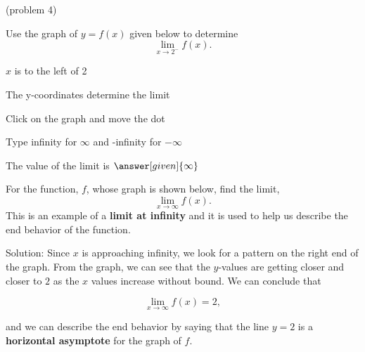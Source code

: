 \documentclass{ximera}
\begin{document}
\begin{problem}(problem 4)

  Use the graph of $y = f(x)$ given below to determine
  \[
  \lim_{x\to 2^-} f(x).
  \]
  
    \begin{hint}
      $x$ is to the left of 2
    \end{hint}
    \begin{hint}
      The y-coordinates determine the limit
    \end{hint}
		\begin{hint}
		  Click on the graph and move the dot
		\end{hint}
		\begin{hint}
		 Type infinity for $\infty$ and -infinity for $-\infty$
		\end{hint}
		The value of the limit is
		 $\answer[given]{\infty}$


	
\end{problem}

\begin{example}[example 5]
For the function, $f$, whose graph is shown below, find the limit,
\[
\lim_{x \to \infty}f(x).
\] 
This is an example of a \textbf{limit at infinity} and it is used to help 
us describe the end behavior of the function.




\vspace{.25in}
Solution:  Since $x$ is approaching infinity, we look for a pattern on the right end of the graph.  
From the graph, we can see that the $y$-values are getting closer and closer to $2$ as the $x$ values 
increase without bound. We can conclude that 

\[
\lim_{x \to \infty}f(x) = 2,
\]

and we can describe the end behavior by saying that the line $y = 2$ is a \textbf{horizontal asymptote} for the graph of $f$.


\end{example}
\end{document}
